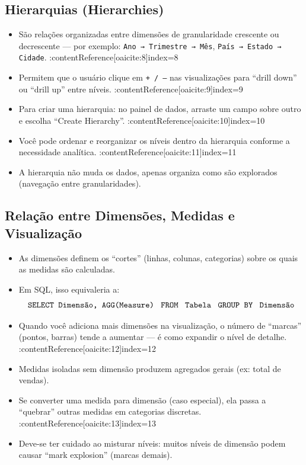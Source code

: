 \subsection*{Hierarquias (Hierarchies)}

\begin{itemize}[leftmargin=*]
  \item São relações organizadas entre dimensões de granularidade crescente ou decrescente — por exemplo: \texttt{Ano → Trimestre → Mês}, \texttt{País → Estado → Cidade}. :contentReference[oaicite:8]{index=8}  
  \item Permitem que o usuário clique em \texttt{+ / –} nas visualizações para “drill down” ou “drill up” entre níveis. :contentReference[oaicite:9]{index=9}  
  \item Para criar uma hierarquia: no painel de dados, arraste um campo sobre outro e escolha “Create Hierarchy”. :contentReference[oaicite:10]{index=10}  
  \item Você pode ordenar e reorganizar os níveis dentro da hierarquia conforme a necessidade analítica. :contentReference[oaicite:11]{index=11}  
  \item A hierarquia não muda os dados, apenas organiza como são explorados (navegação entre granularidades).  
\end{itemize}

\subsection*{Relação entre Dimensões, Medidas e Visualização}

\begin{itemize}[leftmargin=*]
  \item As dimensões definem os “cortes” (linhas, colunas, categorias) sobre os quais as medidas são calculadas.  
  \item Em SQL, isso equivaleria a:
  \[
    \texttt{SELECT Dimensão, AGG(Measure) \;FROM\; Tabela \;GROUP BY\; Dimensão}
  \]
  \item Quando você adiciona mais dimensões na visualização, o número de “marcas” (pontos, barras) tende a aumentar — é como expandir o nível de detalhe. :contentReference[oaicite:12]{index=12}  
  \item Medidas isoladas sem dimensão produzem agregados gerais (ex: total de vendas).  
  \item Se converter uma medida para dimensão (caso especial), ela passa a “quebrar” outras medidas em categorias discretas. :contentReference[oaicite:13]{index=13}  
  \item Deve-se ter cuidado ao misturar níveis: muitos níveis de dimensão podem causar “mark explosion” (marcas demais).
\end{itemize}

